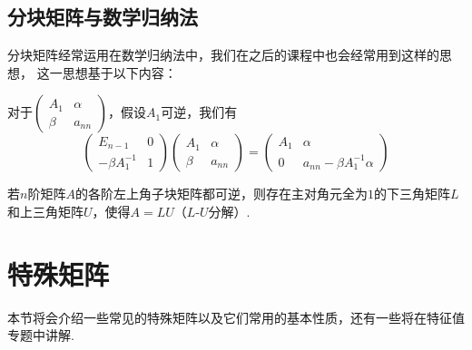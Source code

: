 \subsection{分块矩阵与数学归纳法}
分块矩阵经常运用在数学归纳法中，我们在之后的课程中也会经常用到这样的思想，
这一思想基于以下内容：

对于$\begin{pmatrix}
    A_1 & \alpha \\ \beta & a_{nn}
\end{pmatrix}$，假设$A_1$可逆，我们有
$$\begin{pmatrix}
    E_{n-1} & 0 \\ -\beta A_1^{-1} & 1
\end{pmatrix}\begin{pmatrix}
    A_1 & \alpha \\ \beta & a_{nn}
\end{pmatrix}=\begin{pmatrix}
    A_1 & \alpha \\ 0 & a_{nn}-\beta A_1^{-1}\alpha
\end{pmatrix}$$

\begin{example}
    若$n$阶矩阵$A$的各阶左上角子块矩阵都可逆，则存在主对角元全为$1$的下三角矩阵$L$和上三角矩阵$U$，使得$A=LU$（$L$-$U$分解）.
\end{example}

\section{特殊矩阵}
本节将会介绍一些常见的特殊矩阵以及它们常用的基本性质，还有一些将在特征值专题中讲解.
